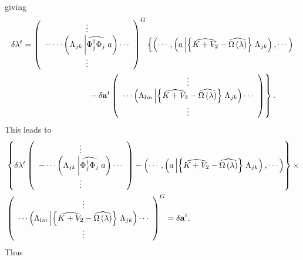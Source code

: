 \documentclass[aps,preprint]{revtex4}%
\begin{document}
giving
\begin{align}
\delta\mathbf{\lambda}^{t}  &  =\left(
\begin{array}
[c]{c}%
\vdots\\
-\cdots\left(  \Lambda_{jk}\left\vert \widehat{\Phi_{j}^{\dagger}\Phi_{j}%
}\right.  a\right)  \cdots\\
\vdots
\end{array}
\right)  ^{G}\left\{  \left(  \cdots,\left(  a\left\vert \left\{
\widehat{K+V_{2}}-\widehat{\Omega\left(  \lambda\right)  }\right\}  \right.
\Lambda_{jk}\right)  ,\cdots\right)  \right. \nonumber\\
&  \qquad\qquad\qquad\qquad\left.  -\,\delta\mathbf{a}^{t}\left(
\begin{array}
[c]{c}%
\vdots\\
\cdots\left(  \Lambda_{lm}\left\vert \left\{  \widehat{K+V_{2}}%
-\widehat{\Omega\left(  \lambda\right)  }\right\}  \right.  \Lambda
_{jk}\right)  \cdots\\
\vdots
\end{array}
\right)  \right\}  .
\end{align}
This leads to
\begin{align}
&  \left\{  \delta\mathbf{\lambda}^{t}\left(
\begin{array}
[c]{c}%
\vdots\\
-\cdots\left(  \Lambda_{jk}\left\vert \widehat{\Phi_{j}^{\dagger}\Phi_{j}%
}\right.  a\right)  \cdots\\
\vdots
\end{array}
\right)  -\left(  \cdots,\left(  a\left\vert \left\{  \widehat{K+V_{2}%
}-\widehat{\Omega\left(  \lambda\right)  }\right\}  \right.  \Lambda
_{jk}\right)  ,\cdots\right)  \right\}  \times\nonumber\\
&  \left(
\begin{array}
[c]{c}%
\vdots\\
\cdots\left(  \Lambda_{lm}\left\vert \left\{  \widehat{K+V_{2}}%
-\widehat{\Omega\left(  \lambda\right)  }\right\}  \right.  \Lambda
_{jk}\right)  \cdots\\
\vdots
\end{array}
\right)  ^{G}=\delta\mathbf{a}^{t}.
\end{align}
Thus
\end{document}
